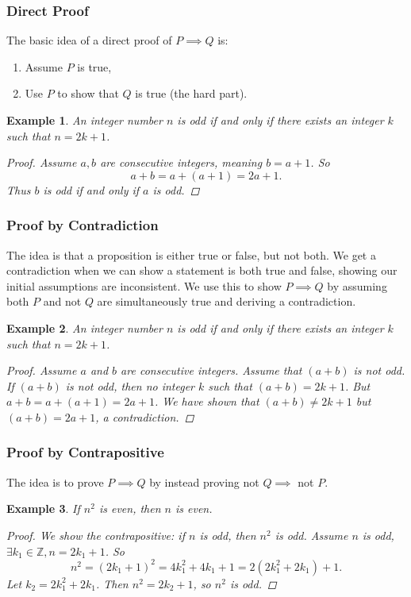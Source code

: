 \documentclass{article}
\newtheorem*{example}{Example}
\begin{document}
\subsubsection{Direct Proof}
The basic idea of a direct proof of $P \implies Q$ is:
\begin{enumerate}
    \item Assume $P$ is true,
    \item Use $P$ to show that $Q$ is true (the hard part).
\end{enumerate}
\begin{example}
    An integer number $n$ is odd if and only if there exists an integer $k$ such that $n=2k+1$.
    \begin{proof}
        Assume $a,b$ are consecutive integers, meaning $b = a + 1$. So
        \[a+b = a+(a+1) = 2a+1.\]
        Thus $b$ is odd if and only if $a$ is odd.
    \end{proof}
\end{example}

\subsubsection{Proof by Contradiction}
The idea is that a proposition is either true or false, but not both. We get a contradiction when we can show a statement is both true and false, showing our initial assumptions are inconsistent. We use this to show $P \implies Q$ by assuming both $P$ and not $Q$ are simultaneously true and deriving a contradiction.
\begin{example}
    An integer number $n$ is odd if and only if there exists an integer $k$ such that $n=2k+1$.
    \begin{proof}
        Assume $a$ and $b$ are consecutive integers. Assume that $(a+b)$ is not odd. If $(a+b)$ is not odd, then no integer $k$ such that $(a+b)=2k+1$. But $a+b = a+(a+1)=2a+1$. We have shown that $(a+b) \neq 2k+1$ but $(a+b)=2a+1$, a contradiction.
    \end{proof}
\end{example}

\subsubsection{Proof by Contrapositive}
The idea is to prove $P \implies Q$ by instead proving not $Q \implies$ not $P$.
\begin{example}
    If $n^2$ is even, then $n$ is even.
    \begin{proof}
        We show the contrapositive: if $n$ is odd, then $n^2$ is odd. Assume $n$ is odd, $\exists k_1 \in \mathbb{Z}, n = 2k_1+1$. So
        \[n^2 = (2k_1+1)^2 = 4k_1^2+4k_1+1=2(2k_1^2+2k_1)+1.\]
        Let $k_2 = 2k_1^2+2k_1$. Then $n^2 = 2k_2 + 1$, so $n^2$ is odd.
    \end{proof}
\end{example}
\end{document}

